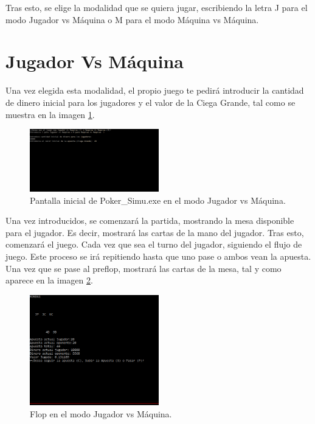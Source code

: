 Tras esto, se elige la modalidad que se quiera jugar, escribiendo la letra J para el modo Jugador vs Máquina o M para el modo Máquina vs Máquina.

\section{Jugador Vs Máquina}

Una vez elegida esta modalidad, el propio juego te pedirá introducir la cantidad de dinero inicial para los jugadores y el valor de la Ciega Grande, tal como se muestra en la imagen \ref{fig:C_ji}.

\begin{figure}[h]
\centering
\includegraphics[width=0.5\textwidth]{figuras/C_ji.png}   
\caption{Pantalla inicial de Poker\_Simu.exe en el modo Jugador vs Máquina.}
\label{fig:C_ji}
\end{figure}

Una vez introducidos, se comenzará la partida, mostrando la mesa disponible para el jugador. Es decir, mostrará las cartas de la mano del jugador. Tras esto, comenzará el juego. Cada vez que sea el turno del jugador, siguiendo el flujo de juego. Este proceso se irá repitiendo hasta que uno pase o ambos vean la apuesta.
Una vez que se pase al preflop, mostrará las cartas de la mesa, tal y como aparece en la imagen \ref{fig:C_j2}.

\begin{figure}[h]
\centering
\includegraphics[width=0.5\textwidth]{figuras/C_j2.png}   
\caption{Flop en el modo Jugador vs Máquina.}
\label{fig:C_j2}
\end{figure}


